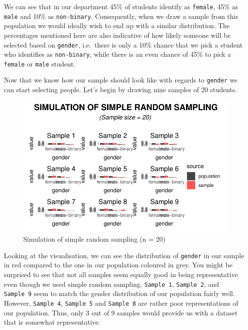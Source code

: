 \documentclass[
  letterpaper,
  DIV=11,
  numbers=noendperiod]{scrreprt}
\begin{document}
We can see that in our department 45\% of students identify as
\texttt{female}, 45\% as \texttt{male} and 10\% as \texttt{non-binary}.
Consequently, when we draw a sample from this population we would
ideally wish to end up with a similar distribution. The percentages
mentioned here are also indicative of how likely someone will be
selected based on \texttt{gender}, i.e.~there is only a 10\% chance that
we pick a student who identifies as \texttt{non-binary}, while there is
an even chance of 45\% to pick a \texttt{female} or \texttt{male}
student.

Now that we know how our sample should look like with regards to
\texttt{gender} we can start selecting people. Let's begin by drawing
nine samples of 20 students.

\begin{figure}[H]

{\centering \includegraphics{09_sources_of_bias_files/figure-latex/drawing-samples-of-20-1.pdf}

}

\caption{Simulation of simple random sampling (n = 20)}

\end{figure}%

Looking at the visualisation, we can see the distribution of
\texttt{gender} in our sample in red compared to the one in our
population coloured in grey. You might be surprised to see that not all
samples seem equally good in being representative even though we used
simple random sampling. \texttt{Sample\ 1}, \texttt{Sample\ 2}, and
\texttt{Sample\ 9} seem to match the gender distribution of our
population fairly well. However, \texttt{Sample\ 4}, \texttt{Sample\ 5}
and \texttt{Sample\ 8} are rather poor representations of our
population. Thus, only 3 out of 9 samples would provide us with a
dataset that is somewhat representative.
\end{document}
